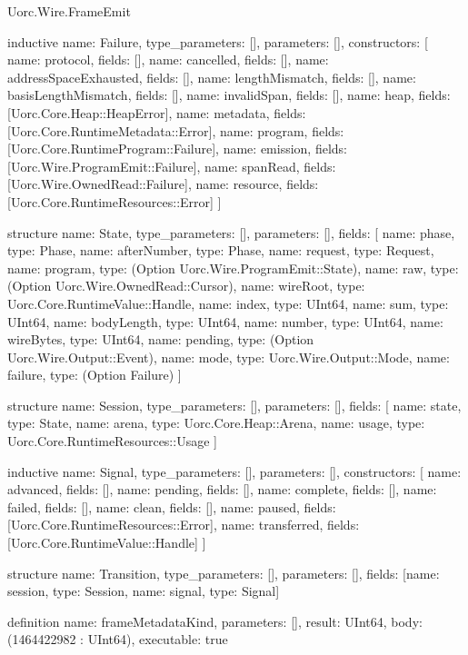 \begin{lexlean}{Uorc.Wire.FrameEmit}
\begin{semanticmodule}
inductive{
  name: Failure,
  type_parameters: [],
  parameters: [],
  constructors: [
    {name: protocol, fields: []},
    {name: cancelled, fields: []},
    {name: addressSpaceExhausted, fields: []},
    {name: lengthMismatch, fields: []},
    {name: basisLengthMismatch, fields: []},
    {name: invalidSpan, fields: []},
    {name: heap, fields: [Uorc.Core.Heap::HeapError]},
    {name: metadata, fields: [Uorc.Core.RuntimeMetadata::Error]},
    {name: program, fields: [Uorc.Core.RuntimeProgram::Failure]},
    {name: emission, fields: [Uorc.Wire.ProgramEmit::Failure]},
    {name: spanRead, fields: [Uorc.Wire.OwnedRead::Failure]},
    {name: resource, fields: [Uorc.Core.RuntimeResources::Error]}
  ]
}

structure{
  name: State,
  type_parameters: [],
  parameters: [],
  fields: [
    {name: phase, type: Phase},
    {name: afterNumber, type: Phase},
    {name: request, type: Request},
    {name: program, type: (Option Uorc.Wire.ProgramEmit::State)},
    {name: raw, type: (Option Uorc.Wire.OwnedRead::Cursor)},
    {name: wireRoot, type: Uorc.Core.RuntimeValue::Handle},
    {name: index, type: UInt64},
    {name: sum, type: UInt64},
    {name: bodyLength, type: UInt64},
    {name: number, type: UInt64},
    {name: wireBytes, type: UInt64},
    {name: pending, type: (Option Uorc.Wire.Output::Event)},
    {name: mode, type: Uorc.Wire.Output::Mode},
    {name: failure, type: (Option Failure)}
  ]
}

structure{
  name: Session,
  type_parameters: [],
  parameters: [],
  fields: [
    {name: state, type: State},
    {name: arena, type: Uorc.Core.Heap::Arena},
    {name: usage, type: Uorc.Core.RuntimeResources::Usage}
  ]
}

inductive{
  name: Signal,
  type_parameters: [],
  parameters: [],
  constructors: [
    {name: advanced, fields: []},
    {name: pending, fields: []},
    {name: complete, fields: []},
    {name: failed, fields: []},
    {name: clean, fields: []},
    {name: paused, fields: [Uorc.Core.RuntimeResources::Error]},
    {name: transferred, fields: [Uorc.Core.RuntimeValue::Handle]}
  ]
}

structure{
  name: Transition,
  type_parameters: [],
  parameters: [],
  fields: [{name: session, type: Session}, {name: signal, type: Signal}]
}

definition{
  name: frameMetadataKind,
  parameters: [],
  result: UInt64,
  body: (1464422982 : UInt64),
  executable: true
}


\end{semanticmodule}
\end{lexlean}

